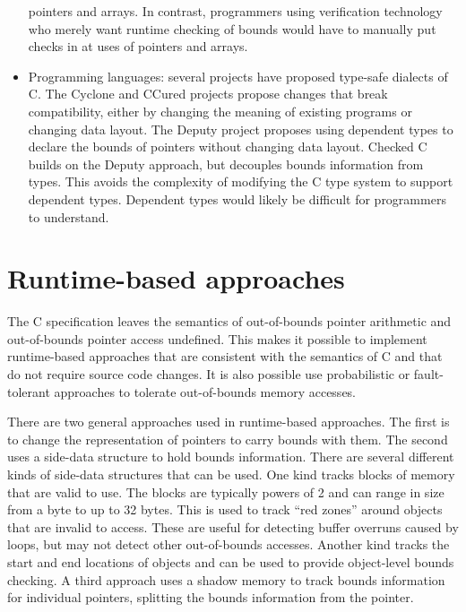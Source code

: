 \begin{itemize}
pointers and arrays.  
In contrast, programmers using verification technology who merely want runtime
checking of bounds would have to manually put checks in at uses of pointers and arrays.
\item Programming languages: several projects have proposed type-safe 
dialects of C.  The Cyclone and CCured projects propose changes that
break compatibility, either by changing the meaning of existing programs
or changing data layout.  The Deputy project proposes using dependent types
to declare the bounds of pointers without changing data layout.  Checked C
builds on the Deputy approach, but decouples bounds information from types.
This avoids the complexity of modifying the C type system to support
dependent types.  Dependent types would likely be difficult for programmers to understand.
\end{itemize}

\section{Runtime-based approaches}

The C specification leaves the semantics of out-of-bounds pointer
arithmetic and out-of-bounds pointer access undefined.  This makes it possible 
to implement runtime-based approaches that are consistent with the semantics of
C and that do not require source code changes.   It is also possible
use probabilistic or fault-tolerant approaches to tolerate out-of-bounds
memory accesses.

There are two general approaches used in runtime-based approaches.
The first is to change the representation of pointers to carry
bounds with them.  The second uses a side-data structure to
hold bounds information.   There are several different kinds of side-data
structures that can be used.  One kind tracks blocks of memory that are valid to
use.  The blocks are typically powers of 2 and can range in size
from a byte to up to 32 bytes. This is used to track ``red zones'' around objects that
are invalid to access.  These are useful for detecting buffer overruns caused
by loops, but may not detect other out-of-bounds accesses.  Another kind tracks the
start and end locations of objects and can be used to provide object-level bounds checking.   A third approach uses a shadow memory to track bounds information for individual pointers, splitting the bounds information from the pointer.

